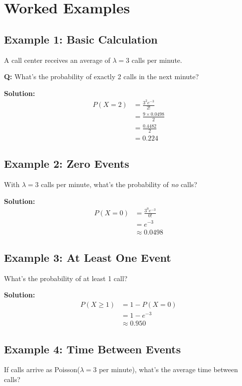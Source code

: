 \documentclass[11pt]{article}
\begin{document}
\section{Worked Examples}

\subsection{Example 1: Basic Calculation}
A call center receives an average of $\lambda = 3$ calls per minute.

\textbf{Q:} What's the probability of exactly 2 calls in the next minute?

\textbf{Solution:}
\begin{align*}
P(X = 2) &= \frac{3^2 e^{-3}}{2!} \\
&= \frac{9 \times 0.0498}{2} \\
&= \frac{0.4482}{2} \\
&= 0.224
\end{align*}

\subsection{Example 2: Zero Events}
With $\lambda = 3$ calls per minute, what's the probability of \textit{no} calls?

\textbf{Solution:}
\begin{align*}
P(X = 0) &= \frac{3^0 e^{-3}}{0!} \\
&= e^{-3} \\
&\approx 0.0498
\end{align*}

\subsection{Example 3: At Least One Event}
What's the probability of at least 1 call?

\textbf{Solution:}
\begin{align*}
P(X \geq 1) &= 1 - P(X = 0) \\
&= 1 - e^{-3} \\
&\approx 0.950
\end{align*}

\subsection{Example 4: Time Between Events}
If calls arrive as Poisson($\lambda = 3$ per minute), what's the average time between calls?
\end{document}
